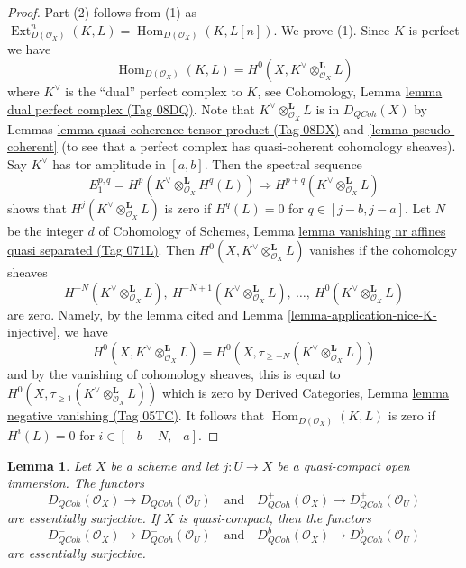\documentclass{amsart}
\theoremstyle{plain}
\newtheorem{lemma}[subsection]{Lemma}
\theoremstyle{definition}
\theoremstyle{remark}
\numberwithin{equation}{subsection}
\def\Hom{\mathop{\mathrm{Hom}}\nolimits}
\def\Ext{\mathop{\mathrm{Ext}}\nolimits}
\def\QCoh{\mathit{QCoh}}
\begin{document}
\begin{proof}
Part (2) follows from (1) as $\Ext^n_{D(\mathcal{O}_X)}(K, L) =
\Hom_{D(\mathcal{O}_X)}(K, L[n])$. We prove (1).
Since $K$ is perfect we have
$$
\Hom_{D(\mathcal{O}_X)}(K, L) =
H^0(X, K^\vee \otimes_{\mathcal{O}_X}^\mathbf{L} L)
$$
where $K^\vee$ is the ``dual'' perfect complex to $K$, see
Cohomology, Lemma \href{https://stacks.math.columbia.edu/tag/08DQ}{lemma dual perfect complex (Tag 08DQ)}.
Note that $K^\vee \otimes_{\mathcal{O}_X}^\mathbf{L} L$
is in $D_\QCoh(X)$ by
Lemmas \href{https://stacks.math.columbia.edu/tag/08DX}{lemma quasi coherence tensor product (Tag 08DX)} and
\ref{lemma-pseudo-coherent} (to see that a perfect complex
has quasi-coherent cohomology sheaves). Say $K^\vee$ has
tor amplitude in $[a, b]$. Then the spectral sequence
$$
E_1^{p, q} = H^p(K^\vee \otimes_{\mathcal{O}_X}^\mathbf{L} H^q(L))
\Rightarrow
H^{p + q}(K^\vee \otimes_{\mathcal{O}_X}^\mathbf{L} L)
$$
shows that $H^j(K^\vee \otimes_{\mathcal{O}_X}^\mathbf{L} L)$
is zero if $H^q(L) = 0$ for $q \in [j - b, j - a]$.
Let $N$ be the integer $d$ of Cohomology of Schemes,
Lemma \href{https://stacks.math.columbia.edu/tag/071L}{lemma vanishing nr affines quasi separated (Tag 071L)}.
Then $H^0(X, K^\vee \otimes_{\mathcal{O}_X}^\mathbf{L} L)$
vanishes if the cohomology sheaves
$$
H^{-N}(K^\vee \otimes_{\mathcal{O}_X}^\mathbf{L} L),
\ H^{-N + 1}(K^\vee \otimes_{\mathcal{O}_X}^\mathbf{L} L),
\ \ldots,
\ H^0(K^\vee \otimes_{\mathcal{O}_X}^\mathbf{L} L)
$$
are zero. Namely, by the lemma cited and
Lemma \ref{lemma-application-nice-K-injective}, we have
$$
H^0(X, K^\vee \otimes_{\mathcal{O}_X}^\mathbf{L} L) =
H^0(X, \tau_{\geq -N}(K^\vee \otimes_{\mathcal{O}_X}^\mathbf{L} L))
$$
and by the vanishing of cohomology sheaves, this is equal to
$H^0(X, \tau_{\geq 1}(K^\vee \otimes_{\mathcal{O}_X}^\mathbf{L} L))$
which is zero by Derived Categories, Lemma
\href{https://stacks.math.columbia.edu/tag/05TC}{lemma negative vanishing (Tag 05TC)}.
It follows that $\Hom_{D(\mathcal{O}_X)}(K, L)$ is zero if
$H^i(L) = 0$ for $i \in [-b - N, -a]$.
\end{proof}


\begin{lemma}
\label{lemma-lift-quasi-coherent}
Let $X$ be a scheme and let $j : U \to X$ be a quasi-compact
open immersion. The functors
$$
D_\QCoh(\mathcal{O}_X) \to D_\QCoh(\mathcal{O}_U)
\quad\text{and}\quad
D^+_\QCoh(\mathcal{O}_X) \to D^+_\QCoh(\mathcal{O}_U)
$$
are essentially surjective. If $X$ is quasi-compact, then the functors
$$
D^-_\QCoh(\mathcal{O}_X) \to D^-_\QCoh(\mathcal{O}_U)
\quad\text{and}\quad
D^b_\QCoh(\mathcal{O}_X) \to D^b_\QCoh(\mathcal{O}_U)
$$
are essentially surjective.
\end{lemma}
\end{document}
